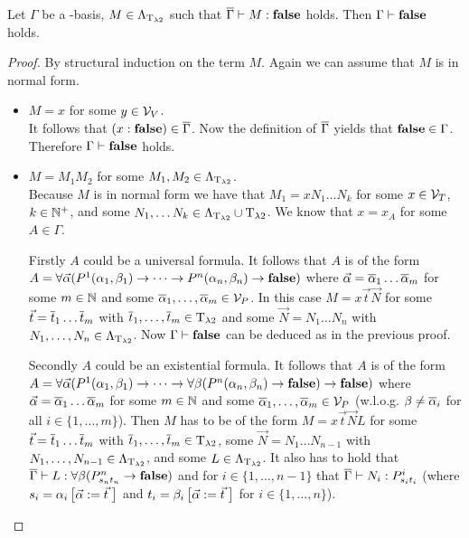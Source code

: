 \begin{lemma}\label{l2}
Let $\Gamma$ be a \SysP-basis, $M\in\Lambda_{\text{T}_{\lambda2}}$ such that $\overline{\Gamma}\vdash M:\textbf{false}$ holds. Then $\Gamma\vdash\textbf{false}$ holds.
\end{lemma}
\begin{proof}
By structural induction on the term $M$.
Again we can assume that $M$ is in normal form.
\begin{itemize}
	\item[] \underline{$M=x$} for some $y\in\mathcal{V}_V$.\\
		It follows that $(x:\textbf{false})\in\overline{\Gamma}$. Now the definition of $\overline{\Gamma}$ yields that $\textbf{false}\in\Gamma$. Therefore $\Gamma\vdash \textbf{false}$ holds.
	\item[] \underline{$M=M_1M_2$} for some $M_1,M_2\in\Lambda_{\text{T}_{\lambda2}}$.\\
		Because $M$ is in normal form we have that $M_1=xN_1\dots N_k$ for some $x\in\mathcal{V}_T$, $k\in\mathbb{N}^+$, and some $N_1,\dots N_k\in\Lambda_{\text{T}_{\lambda2}}\cup\text{T}_{\lambda2}$.
		We know that $x=x_A$ for some $A\in\Gamma$.
		
		Firstly $A$ could be a universal formula. It follows that $A$ is of the form $A=\forall\predVec(P^1(\predFst[1],\predSnd[1])\to\dots\to P^n(\predFst[n],\predSnd[n])\to\false)$ where $\predVec=\predVec[1]\dots\predVec[m]$ for some $m\in\mathbb{N}$ and some $\predVec[1],\dots,\predVec[m]\in\VarP$. In this case $M=x\vec{t}\vec{N}$ for some $\predTVec=\predTVec[1]\dots \predTVec[m]$ with $\predTVec[1],\dots,\predTVec[m]\in\lambdaTypes$ and some $\vec{N}=N_1\dots N_n$ with $N_1,\dots,N_n\in\Lambda_{\text{T}_{\lambda2}}$. Now $\Gamma\vdash\textbf{false}$ can be deduced as in the previous proof.
		
		Secondly $A$ could be an existential formula. It follows that $A$ is of the form $A=\forall\predVec(P^1(\predFst[1],\predSnd[1])\to\dots\to \forall\beta(P^n(\predFst[n],\predSnd[n])\to\false)\to \false)$ where $\predVec=\predVec[1]\dots\predVec[m]$ for some $m\in\mathbb{N}$ and some $\predVec[1],\dots,\predVec[m]\in\VarP$ (w.l.o.g. $\beta\neq\predVec[i]$ for all $i\in\{1,\dots,m\}$).
		Then $M$ has to be of the form $M=x\vec{t}\vec{N}L$ for some $\predTVec=\predTVec[1]\dots \predTVec[m]$ with $\predTVec[1],\dots,\predTVec[m]\in\lambdaTypes$, some $\vec{N}=N_1\dots N_{n-1}$ with $N_1,\dots,N_{n-1}\in\Lambda_{\text{T}_{\lambda2}}$, and some $L\in\Lambda_{\text{T}_{\lambda2}}$. It also has to hold that $\trans{\Gamma}\lambdaModels L:\forall\beta(\code{P^n}{\predTFst[n]}{\predTSnd[n]}\to\false)$ and for $i\in\{1,\dots,n-1\}$ that $\trans{\Gamma}\lambdaModels N_i:\code{P^i}{\predTFst[i]}{\predTSnd[i]}$ (where $\predTFst[i]=\predFst[i]\left[\predVec:=\predTVec\hspace{1mm}\right]$ and  $\predTSnd[i]=\predSnd[i]\left[\predVec:=\predTVec\hspace{1mm}\right]$ for $i\in\{1,\dots,n\}$).
		

\end{itemize}
\end{proof}
